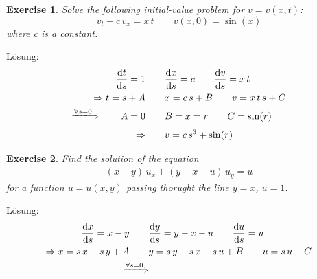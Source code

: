 \documentclass[size=12pt]{report}
\newtheorem{uebung}{Exercise}
\newcommand{\diff}[2]{\frac{\text{d}#1}{\text{d}#2}}
\begin{document}
\begin{uebung}
    Solve the following initial-value problem for $v=v(x,t)$:
    \begin{equation*}
        v_t+c\, v_x = x\,t \qquad v(x,0)=\sin(x)
    \end{equation*}
    where c is a constant.
\end{uebung}
Lösung:
\begin{align*}
    \diff{t}{s}=1 \qquad &\diff{x}{s}=c \qquad \diff{v}{s}=x\, t \\
    \Rightarrow t=s+A \qquad &x=c\, s + B \qquad v=x\, t\, s + C \\
    \xLongrightarrow{\forall s = 0} \qquad A=0 \qquad &B=x=r \qquad C=\sin(r) \\
    \Rightarrow \qquad &v=c\, s^3 + \sin(r)
\end{align*}

\begin{uebung}
    Find the solution of the equation
    \begin{align*}
        (x-y)\, u_x+(y-x-u)\, u_y = u
    \end{align*}
    for a function $u=u(x,y)$ passing thorught the line $y=x$, $u=1$.
\end{uebung}
Lösung:
\begin{align*}
    \diff{x}{s}=x-y \qquad &\diff{y}{s}=y-x-u \qquad \diff{u}{s}=u \\
    \Rightarrow x=s\, x - s\, y + A \qquad &y=s\, y - s\, x - s\, u + B \qquad u = s\, u + C \\
    \xRightarrow{\forall s = 0} 
\end{align*}
\end{document}
